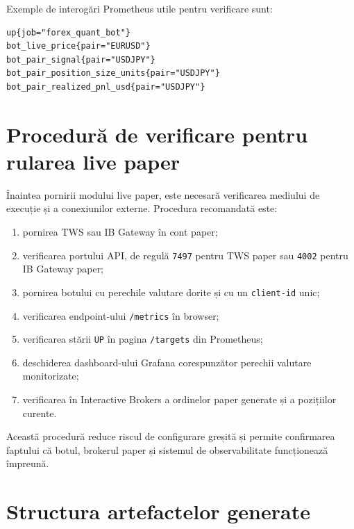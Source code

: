 Exemple de interogări Prometheus utile pentru verificare sunt:

\begin{code}
\begin{verbatim}
up{job="forex_quant_bot"}
bot_live_price{pair="EURUSD"}
bot_pair_signal{pair="USDJPY"}
bot_pair_position_size_units{pair="USDJPY"}
bot_pair_realized_pnl_usd{pair="USDJPY"}
\end{verbatim}
\caption{Interogări Prometheus pentru monitorizarea botului}
\label{code:anexa_prometheus_queries}
\end{code}

\section{Procedură de verificare pentru rularea live paper}
\label{anexa:procedura_live_paper}

Înaintea pornirii modului live paper, este necesară verificarea mediului de execuție și a conexiunilor externe. Procedura recomandată este:

\begin{enumerate}
    \item pornirea TWS sau IB Gateway în cont paper;
    \item verificarea portului API, de regulă \texttt{7497} pentru TWS paper sau \texttt{4002} pentru IB Gateway paper;
    \item pornirea botului cu perechile valutare dorite și cu un \texttt{client-id} unic;
    \item verificarea endpoint-ului \texttt{/metrics} în browser;
    \item verificarea stării \texttt{UP} în pagina \texttt{/targets} din Prometheus;
    \item deschiderea dashboard-ului Grafana corespunzător perechii valutare monitorizate;
    \item verificarea în Interactive Brokers a ordinelor paper generate și a pozițiilor curente.
\end{enumerate}

Această procedură reduce riscul de configurare greșită și permite confirmarea faptului că botul, brokerul paper și sistemul de observabilitate funcționează împreună.

\section{Structura artefactelor generate}
\label{anexa:artefacte}

